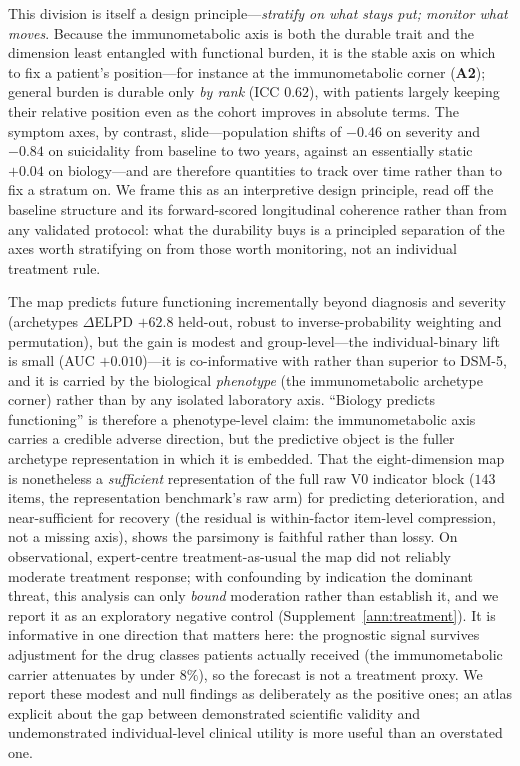 This division is itself a design principle---\emph{stratify on what stays put; monitor
what moves}. Because the immunometabolic axis is both the durable trait and the
dimension least entangled with functional burden, it is the stable axis on which to fix a
patient's position---for instance at the immunometabolic corner (\textbf{A2}); general
burden is durable only \emph{by rank} (ICC $0.62$), with patients largely keeping their
relative position even as the cohort improves in absolute terms. The symptom axes, by
contrast, slide---population shifts of $-0.46$ on severity and $-0.84$ on suicidality from
baseline to two years, against an essentially static $+0.04$ on biology---and are
therefore quantities to track over time rather than to fix a stratum on. We frame this as
an interpretive design principle, read off the baseline structure and its forward-scored
longitudinal coherence rather than from any validated protocol: what the durability buys
is a principled separation of the axes worth stratifying on from those worth monitoring,
not an individual treatment rule.

The map predicts future functioning
incrementally beyond diagnosis and severity (archetypes $\Delta$ELPD $+62.8$
held-out, robust to inverse-probability weighting and permutation), but the gain is
modest and group-level---the individual-binary lift is small (AUC $+0.010$)---it is
co-informative with rather than superior to DSM-5, and it is carried by the biological
\emph{phenotype} (the immunometabolic archetype corner) rather than by any isolated
laboratory axis. ``Biology predicts functioning'' is therefore a phenotype-level
claim: the immunometabolic axis carries a credible adverse direction, but the
predictive object is the fuller archetype representation in which it is embedded. That
the eight-dimension map is nonetheless a \emph{sufficient} representation of the full raw
V0 indicator block ($143$ items, the representation benchmark's raw arm) for predicting
deterioration, and near-sufficient for recovery (the residual
is within-factor item-level compression, not a missing axis), shows the parsimony is
faithful rather than lossy. On observational, expert-centre treatment-as-usual the map did not
reliably moderate treatment response; with confounding by indication the dominant threat,
this analysis can only \emph{bound} moderation rather than establish it, and we report it as
an exploratory negative control (Supplement~\ref{ann:treatment}). It is informative in one
direction that matters here: the prognostic signal survives adjustment for the drug classes
patients actually received (the immunometabolic carrier attenuates by under $8\%$), so the
forecast is not a treatment proxy. We report these modest and null findings as deliberately
as the positive ones; an atlas explicit about the gap between demonstrated scientific
validity and undemonstrated individual-level clinical utility is more useful than an
overstated one.

